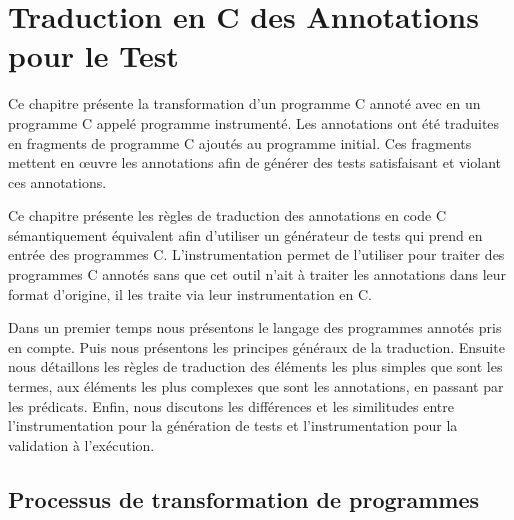 
\chapter{Traduction en C des Annotations pour le Test}
\label{sec:traduction}

\chapterintro


Ce chapitre présente la transformation d'un programme C annoté avec \eacsl en un
programme C appelé programme instrumenté.
Les annotations \eacsl ont été traduites en fragments de programme C ajoutés au
programme initial.
Ces fragments mettent en \oe{}uvre les annotations \eacsl afin de générer des
tests satisfaisant et violant ces annotations.

Ce chapitre présente les règles de traduction des annotations \eacsl en code C
sémantiquement équivalent afin d'utiliser un générateur de tests qui prend en
entrée des programmes C.
L'instrumentation permet de l'utiliser pour traiter des programmes C annotés
sans que cet outil n'ait à traiter les annotations dans leur format d'origine,
il les traite via leur instrumentation en C.

Dans un premier temps nous présentons le langage des programmes annotés pris en
compte.
Puis nous présentons les principes généraux de la traduction.
Ensuite nous détaillons les règles de traduction des éléments les plus simples
que sont les termes, aux éléments les plus complexes que sont les annotations,
en passant par les prédicats.
Enfin, nous discutons les différences et les similitudes entre l'instrumentation
pour la génération de tests et l'instrumentation pour la validation à
l'exécution.


\section{Processus de transformation de programmes}




